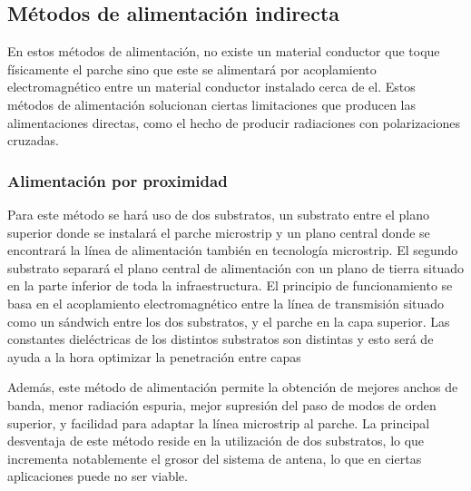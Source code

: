 \subsection{Métodos de alimentación indirecta}
\par En estos métodos de alimentación, no existe un material conductor que toque físicamente el parche sino que este se alimentará por acoplamiento electromagnético entre un material conductor instalado cerca de el. Estos métodos de alimentación solucionan ciertas limitaciones que producen las alimentaciones directas, como el hecho de producir radiaciones con polarizaciones cruzadas.

\subsubsection{Alimentación por proximidad}
\par Para este método se hará uso de dos substratos, un substrato entre el plano superior donde se instalará el parche microstrip y un plano central donde se encontrará la línea de alimentación también en tecnología microstrip. El segundo substrato separará el plano central de alimentación con un plano de tierra situado en la parte inferior de toda la infraestructura. El principio de funcionamiento se basa en el acoplamiento electromagnético entre la línea de transmisión situado como un sándwich entre los dos substratos, y el parche en la capa superior.  Las constantes dieléctricas de los distintos substratos son distintas y esto será de ayuda a la hora optimizar la penetración entre capas
\\
\par Además, este método de alimentación permite la obtención de mejores anchos de banda, menor radiación espuria, mejor supresión del paso de modos de orden superior, y facilidad para adaptar la línea microstrip al parche. La principal desventaja de este método reside en la utilización de dos substratos, lo que incrementa notablemente el grosor del sistema de antena, lo que en ciertas aplicaciones puede no ser viable.

